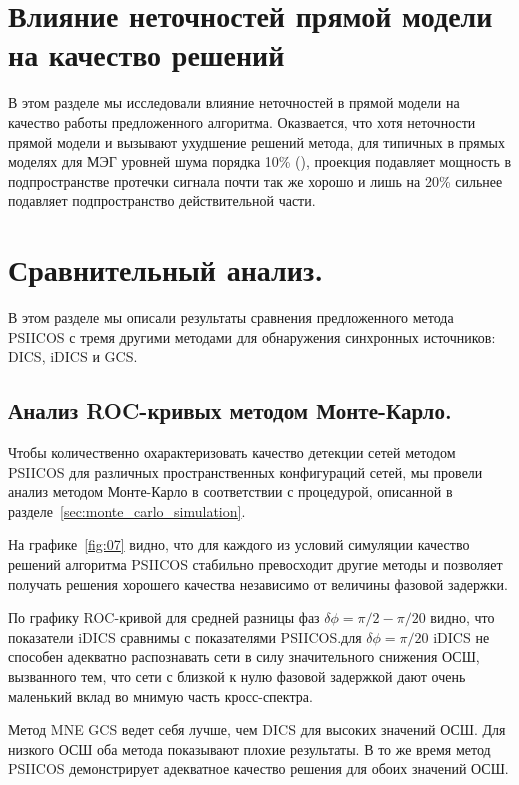 \section{Влияние неточностей прямой модели на качество решений}\label{sec:forward_model_errors_effect}

В этом разделе мы исследовали влияние неточностей в прямой модели на качество
работы предложенного алгоритма. Оказвается, что хотя неточности прямой модели и
вызывают ухудшение решений метода, для типичных в прямых моделях для МЭГ
уровней шума порядка 10\% (\cite{Mosher1999}), проекция подавляет мощность в
подпространстве протечки сигнала почти так же хорошо и лишь на 20\% сильнее
подавляет подпространство действительной части.

\section{Сравнительный анализ.}

 В этом разделе мы описали результаты сравнения предложенного метода PSIICOS
 с тремя другими методами для обнаружения синхронных источников: DICS, iDICS и GCS.\@

\subsection{Анализ ROC-кривых методом Монте-Карло.}
Чтобы количественно охарактеризовать качество детекции сетей методом PSIICOS для различных
пространственных конфигураций сетей, мы провели анализ методом Монте-Карло в соответствии
с процедурой, описанной в разделе~\ref{sec:monte_carlo_simulation}.

На графике~\ref{fig:07} видно, что для каждого из условий симуляции качество решений
алгоритма PSIICOS стабильно превосходит другие методы и позволяет получать решения хорошего
качества независимо от величины фазовой задержки.

По графику ROC-кривой для средней разницы фаз $\delta\phi=\pi/2 - \pi/20$ видно, что
показатели iDICS сравнимы с показателями PSIICOS. для $\delta\phi = \pi/20$ iDICS
не способен адекватно распознавать сети в силу значительного снижения ОСШ, вызванного
тем, что сети с близкой к нулю фазовой задержкой дают очень маленький вклад во
мнимую часть кросс-спектра.

Метод MNE GCS ведет себя лучше, чем DICS для высоких значений ОСШ. Для низкого ОСШ
оба метода показывают плохие результаты. В то же время метод PSIICOS демонстрирует
адекватное качество решения для обоих значений ОСШ.

